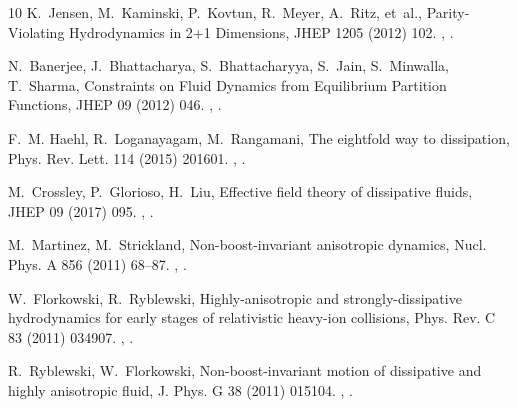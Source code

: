 \documentclass[preprint,12pt]{elsarticle}
\begin{document}
\begin{thebibliography}{10}
K.~Jensen, M.~Kaminski, P.~Kovtun, R.~Meyer, A.~Ritz, et~al., {Parity-Violating
  Hydrodynamics in 2+1 Dimensions}, JHEP 1205 (2012) 102.
\newblock \href {http://arxiv.org/abs/1112.4498} {},
  \href {https://doi.org/10.1007/JHEP05(2012)102}
  {}.

N.~Banerjee, J.~Bhattacharya, S.~Bhattacharyya, S.~Jain, S.~Minwalla,
  T.~Sharma, {Constraints on Fluid Dynamics from Equilibrium Partition
  Functions}, JHEP 09 (2012) 046.
\newblock \href {http://arxiv.org/abs/1203.3544} {},
  \href {https://doi.org/10.1007/JHEP09(2012)046}
  {}.

F.~M. Haehl, R.~Loganayagam, M.~Rangamani, {The eightfold way to dissipation},
  Phys. Rev. Lett. 114 (2015) 201601.
\newblock \href {http://arxiv.org/abs/1412.1090} {},
  \href {https://doi.org/10.1103/PhysRevLett.114.201601}
  {}.

M.~Crossley, P.~Glorioso, H.~Liu, {Effective field theory of dissipative
  fluids}, JHEP 09 (2017) 095.
\newblock \href {http://arxiv.org/abs/1511.03646} {},
  \href {https://doi.org/10.1007/JHEP09(2017)095}
  {}.

M.~Martinez, M.~Strickland, {Non-boost-invariant anisotropic dynamics}, Nucl.
  Phys. A 856 (2011) 68--87.
\newblock \href {http://arxiv.org/abs/1011.3056} {},
  \href {https://doi.org/10.1016/j.nuclphysa.2011.02.003}
  {}.

W.~Florkowski, R.~Ryblewski, {Highly-anisotropic and strongly-dissipative
  hydrodynamics for early stages of relativistic heavy-ion collisions}, Phys.
  Rev. C 83 (2011) 034907.
\newblock \href {http://arxiv.org/abs/1007.0130} {},
  \href {https://doi.org/10.1103/PhysRevC.83.034907}
  {}.

R.~Ryblewski, W.~Florkowski, {Non-boost-invariant motion of dissipative and
  highly anisotropic fluid}, J. Phys. G 38 (2011) 015104.
\newblock \href {http://arxiv.org/abs/1007.4662} {},
  \href {https://doi.org/10.1088/0954-3899/38/1/015104}
  {}.


\end{thebibliography}
\end{document}
